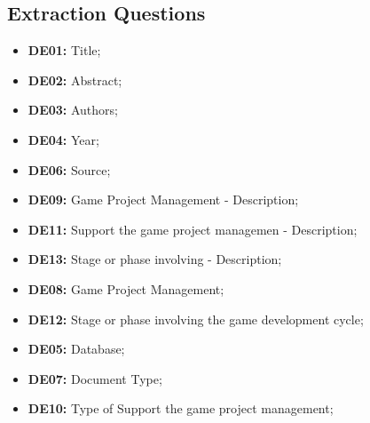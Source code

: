 \documentclass [11pt]{article}
\begin{document}
\subsection{Extraction Questions}
\begin{itemize}
\item \textbf{DE01: } Title;
\item \textbf{DE02: } Abstract;
\item \textbf{DE03: } Authors;
\item \textbf{DE04: } Year;
\item \textbf{DE06: } Source;
\item \textbf{DE09: } Game Project Management - Description;
\item \textbf{DE11: } Support the game project managemen - Description;
\item \textbf{DE13: } Stage or phase involving - Description;
\item \textbf{DE08: } Game Project Management;
\item \textbf{DE12: } Stage or phase involving the game development cycle;
\item \textbf{DE05: } Database;
\item \textbf{DE07: } Document Type;
\item \textbf{DE10: } Type of Support the game project management;
\end{itemize}
\end{document}

